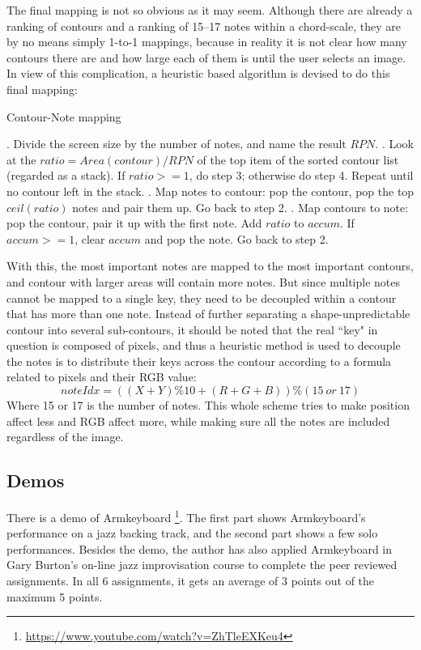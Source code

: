 The final mapping is not so obvious as it may seem. Although there are already a ranking of contours and a ranking of 15--17 notes within a chord-scale, they are by no means simply 1-to-1 mappings, because in reality it is not clear how many contours there are and how large each of them is until the user selects an image. In view of this complication, a heuristic based algorithm is devised to do this final mapping:
\begin{algorithm}
\caption{Contour-Note mapping}
\begin{algorithmic}
. Divide the screen size by the number of notes, and name the result $RPN$.
. Look at the $ ratio = Area(contour) / RPN $ of the top item of the sorted contour list (regarded as a stack). \newline If $ratio>=1$, do step	3; otherwise do step 4. Repeat until no contour left in the stack.
. Map notes to contour: pop the contour, pop the top $ ceil(ratio)$ notes and pair them up. Go back to step 2.
. Map contours to note: pop the contour, pair it up with the first	note. Add $ratio$ to $accum$. If $accum>=1$, clear $accum$ and pop the note. Go back to step 2.
\end{algorithmic}
\end{algorithm}
With this, the most important notes are mapped to the most important contours, and contour with larger areas will contain more notes. But since multiple notes cannot be mapped to a single key, they need to be decoupled  within a contour that has more than one note. Instead of further separating a shape-unpredictable contour into several sub-contours, it should be noted that the real ``key" in question is composed of pixels, and thus a heuristic method is used to decouple the notes is to distribute their keys across the contour according to a formula related to pixels and their RGB value:
\begin{equation}
\mathit{noteIdx = ((X + Y) \% 10 + (R + G + B)) \% (15\ or\ 17)}
\end{equation}
Where 15 or 17 is the number of notes. This whole scheme tries to make position affect less
and RGB affect more, while making sure all the notes are included regardless of the image.

\subsection{Demos}
There is a demo of Armkeyboard \footnote{\url{https://www.youtube.com/watch?v=ZhTleEXKeu4}}. The first part shows Armkeyboard's performance on a jazz backing track, and the second part shows a few solo performances. Besides the demo, the author has also applied Armkeyboard in Gary Burton's on-line jazz improvisation course to complete the peer reviewed assignments. In all 6 assignments, it gets an average of 3 points out of the maximum 5 points.


